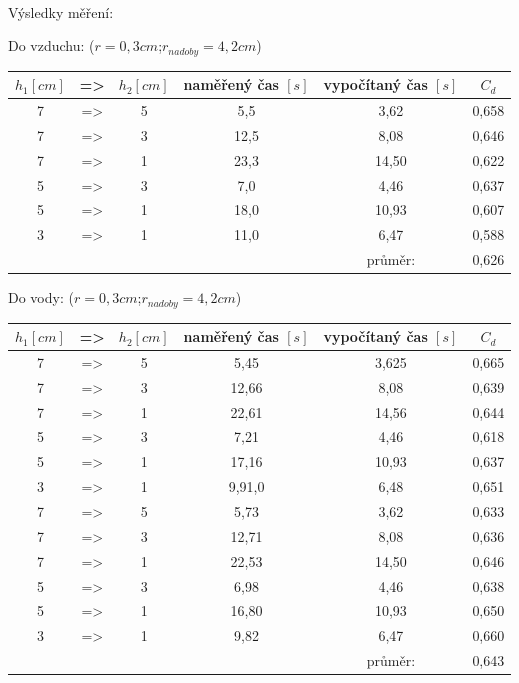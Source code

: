 \documentclass[14pt,a4paper]{article}
\begin{document}
\paragraph{}
Výsledky měření:
\begin{center}
\begin{large}
Do vzduchu: ($r=0,3cm$;$r_{nadoby}=4,2cm$)\\
\end{large}
\begin{tabular}{|ccc|c|c||c||}
\hline 
$h_1 [cm]$&=>&$h_2 [cm]$& naměřený čas $[s]$& vypočítaný čas $[s]$ & $C_d$\\ 
\hline 
\hline 
7 &=>& 5 & 5,5 & 3,62 & 0,658\\ 
\hline 
7 &=>& 3 & 12,5 & 8,08 & 0,646\\ 
\hline 
7 &=>& 1 & 23,3 & 14,50 & 0,622\\ 
\hline 
5 &=>& 3 & 7,0 & 4,46 & 0,637\\ 
\hline 
5 &=>& 1 & 18,0 & 10,93& 0,607\\ 
\hline 
3 &=>& 1 & 11,0 & 6,47 & 0,588\\ 
\hline 
\hline 
&&  &  & průměr: & 0,626\\ 
\hline 
\end{tabular}
\end{center}
\begin{center}
\begin{large}
Do vody: ($r=0,3cm$;$r_{nadoby}=4,2cm$)\\
\end{large}
\begin{tabular}{|ccc|c|c||c||}
\hline 
$h_1 [cm]$&=>&$h_2 [cm]$& naměřený čas $[s]$& vypočítaný čas $[s]$ & $C_d$\\ 
\hline 
\hline 
7 &=>& 5 & 5,45 & 3,625 & 0,665\\ 
\hline 
7 &=>& 3 & 12,66 & 8,08 & 0,639\\ 
\hline 
7 &=>& 1 & 22,61 & 14,56 & 0,644\\ 
\hline 
5 &=>& 3 & 7,21 & 4,46 & 0,618\\ 
\hline 
5 &=>& 1 & 17,16 & 10,93& 0,637\\ 
\hline 
3 &=>& 1 & 9,91,0 & 6,48 & 0,651\\ 
\hline 
7 &=>& 5 & 5,73 & 3,62 & 0,633\\ 
\hline 
7 &=>& 3 & 12,71 & 8,08 & 0,636\\ 
\hline 
7 &=>& 1 & 22,53 & 14,50 & 0,646\\ 
\hline 
5 &=>& 3 & 6,98 & 4,46 & 0,638\\ 
\hline 
5 &=>& 1 & 16,80 & 10,93& 0,650\\ 
\hline 
3 &=>& 1 & 9,82 & 6,47 & 0,660\\ 
\hline 
\hline 
&&  &  & průměr: & 0,643\\ 
\hline 
\end{tabular}
\end{center}
\end{document}
